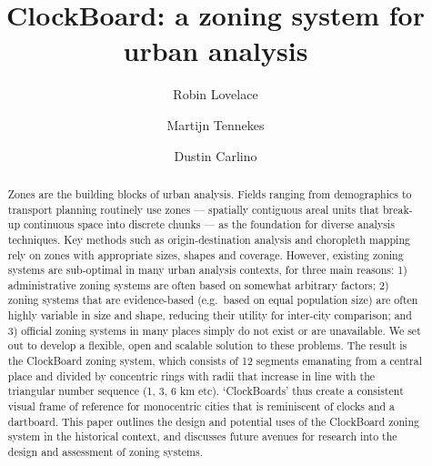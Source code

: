 \documentclass{josis}
\begin{document}


\title{ClockBoard: a zoning system for urban analysis}

  \author{Robin Lovelace}
  \author{Martijn Tennekes}
  \author{Dustin Carlino}

\maketitle


\begin{abstract}
Zones are the building blocks of urban analysis. Fields ranging from
demographics to transport planning routinely use zones --- spatially
contiguous areal units that break-up continuous space into discrete
chunks --- as the foundation for diverse analysis techniques. Key
methods such as origin-destination analysis and choropleth mapping
rely on zones with appropriate sizes, shapes and coverage. However,
existing zoning systems are sub-optimal in many urban analysis
contexts, for three main reasons: 1) administrative zoning systems are
often based on somewhat arbitrary factors; 2) zoning systems that are
evidence-based (e.g.~based on equal population size) are
often highly variable in size and shape, reducing their
utility for inter-city comparison; and 3) official zoning systems in many places
simply do not exist or are unavailable.
We set out to develop a flexible, open and scalable solution to these problems.
The result is the ClockBoard zoning system, which
consists of 12 segments emanating from a central place and divided by concentric rings
with radii that increase in line with the triangular number sequence (1, 3, 6 km etc).
`ClockBoards' thus create a consistent visual frame of reference
for monocentric cities that is reminiscent of clocks and a dartboard.
This paper outlines the design and potential uses of the ClockBoard
zoning system in the historical context, and
discusses future avenues for research into the design and assessment of zoning systems.
\end{abstract}
\end{document}

